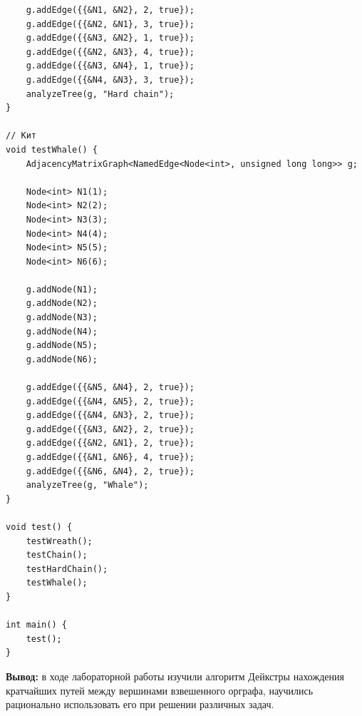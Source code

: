 \documentclass[a4paper,14pt]{extarticle}
\begin{document}
\begin{enumerate}[1.]
\begin{verbatim}
    g.addEdge({{&N1, &N2}, 2, true});
    g.addEdge({{&N2, &N1}, 3, true});
    g.addEdge({{&N3, &N2}, 1, true});
    g.addEdge({{&N2, &N3}, 4, true});
    g.addEdge({{&N3, &N4}, 1, true});
    g.addEdge({{&N4, &N3}, 3, true});
    analyzeTree(g, "Hard chain");
}

// Кит
void testWhale() {
    AdjacencyMatrixGraph<NamedEdge<Node<int>, unsigned long long>> g;

    Node<int> N1(1);
    Node<int> N2(2);
    Node<int> N3(3);
    Node<int> N4(4);
    Node<int> N5(5);
    Node<int> N6(6);

    g.addNode(N1);
    g.addNode(N2);
    g.addNode(N3);
    g.addNode(N4);
    g.addNode(N5);
    g.addNode(N6);

    g.addEdge({{&N5, &N4}, 2, true});
    g.addEdge({{&N4, &N5}, 2, true});
    g.addEdge({{&N4, &N3}, 2, true});
    g.addEdge({{&N3, &N2}, 2, true});
    g.addEdge({{&N2, &N1}, 2, true});
    g.addEdge({{&N1, &N6}, 4, true});
    g.addEdge({{&N6, &N4}, 2, true});
    analyzeTree(g, "Whale");
}

void test() {
    testWreath();
    testChain();
    testHardChain();
    testWhale();
}

int main() {
    test();
}
                    \end{verbatim}
                    
        \end{enumerate}

\textbf{Вывод: } в ходе лабораторной работы изучили алгоритм Дейкстры нахождения кратчайших путей между вершинами взвешенного орграфа,
научились рационально использовать его при решении различных задач.
\end{document}
